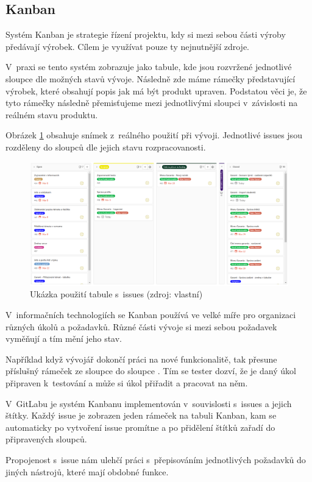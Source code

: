 \documentclass[czech,BP]{thesiskiv}
\begin{document}
\subsection{Kanban}
	\par Systém Kanban je strategie řízení projektu, kdy si mezi sebou části výroby předávají výrobek. Cílem je využívat pouze ty nejnutnější zdroje.
	\par V~praxi se tento systém zobrazuje jako tabule, kde jsou rozvržené jednotlivé sloupce dle možných stavů vývoje. Následně zde máme rámečky představující výrobek, které obsahují popis jak má být produkt upraven. Podstatou věci je, že tyto rámečky následně přemisťujeme mezi jednotlivými sloupci v~závislosti na reálném stavu produktu.
	\par Obrázek \ref{fig:kanban} obsahuje snímek z~reálného použití při vývoji. Jednotlivé issues jsou rozděleny do sloupců dle jejich stavu rozpracovanosti.
	\begin{figure}[H]
		\centering
		\includegraphics[width=\textwidth]{img/rizeni_projektu/kanban}
		\caption{Ukázka použití tabule s~issues (zdroj: vlastní)}
		\label{fig:kanban}
	\end{figure}
	\par V~informačních technologiích se Kanban používá ve velké míře pro organizaci různých úkolů a požadavků. Různé části vývoje si mezi sebou požadavek vyměňují a tím mění jeho stav.
	\par Například když vývojář dokončí práci na nové funkcionalitě, tak přesune příslušný rámeček ze sloupce  do sloupce . Tím se tester dozví, že je daný úkol připraven k~testování a může si úkol přiřadit a pracovat na něm.
	\par V~GitLabu je systém Kanbanu implementován v~souvislosti s~issues a jejich štítky. Každý issue je zobrazen jeden rámeček na tabuli Kanban, kam se automaticky po vytvoření issue promítne a po přidělení štítků zařadí do připravených sloupců.
	\par Propojenost s~issue nám ulehčí práci s~přepisováním jednotlivých požadavků do jiných nástrojů, které mají obdobné funkce.
\end{document}
